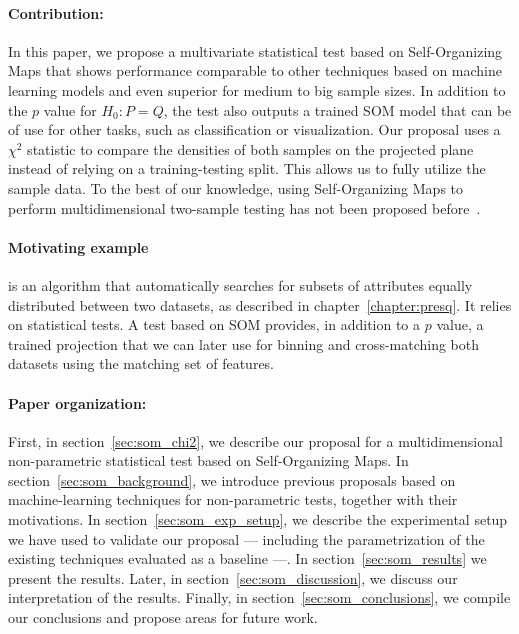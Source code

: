 \paragraph{Contribution:} In this paper, we propose a multivariate statistical test based on
Self-Organizing Maps that shows performance comparable to other techniques based on 
machine learning models and even superior for medium to big sample sizes. In addition to the 
$p$ value for $H_0: P = Q$, the test also outputs a trained \gls{SOM} model that can be of
use for other tasks, such as classification or visualization.
Our proposal uses a $\chi^2$ statistic to compare the densities of both samples on
the projected plane instead of relying on a training-testing split. This allows us to fully
utilize the sample data. To the best of our knowledge, using Self-Organizing Maps
to perform multidimensional two-sample testing has not been proposed
before~\cite{kaski1998bibliography,oja_bibliography_2003,polla_bibliography_2006}.

\paragraph{Motivating example} \PresQ is an algorithm that automatically searches
for subsets of attributes equally distributed between two datasets, as
described in chapter~\ref{chapter:presq}.
It relies on statistical tests. A test based on \gls{SOM} provides, in addition to a $p$ value,
a trained projection that we can later use for binning and cross-matching both datasets using
the matching set of features.

\paragraph{Paper organization:} First, in section~\ref{sec:som_chi2}, we describe our proposal
for a multidimensional non-parametric statistical test based on Self-Organizing Maps.
In section~\ref{sec:som_background}, we introduce previous proposals based on machine-learning
techniques for non-parametric tests, together with their motivations.
In section~\ref{sec:som_exp_setup}, we describe the experimental setup we have used
to validate our proposal --- including the parametrization of the existing techniques
evaluated as a baseline ---. In section~\ref{sec:som_results} we present the results.
Later, in section~\ref{sec:som_discussion}, we discuss our interpretation of the results.
Finally, in section~\ref{sec:som_conclusions}, we compile our conclusions and propose areas for future
work.



